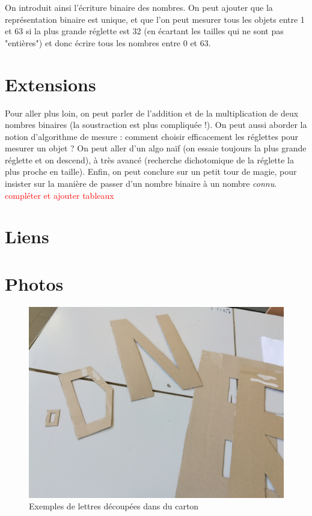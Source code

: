 \documentclass[a4paper,12pt]{scrartcl}
\begin{document}
On introduit ainsi l'écriture binaire des nombres.
On peut ajouter que la représentation binaire est unique, et que l'on peut mesurer tous les objets entre 1 et 63 si la plus grande réglette est 32 (en écartant les tailles qui ne sont pas "entières") et donc écrire tous les nombres entre 0 et 63.


\section{Extensions}

Pour aller plus loin, on peut parler de l'addition et de la multiplication de deux nombres binaires (la soustraction est plus compliquée !).
On peut aussi aborder la notion d'algorithme de mesure : comment choisir efficacement les réglettes pour mesurer un objet ? On peut aller d'un algo naïf (on essaie toujours la plus grande réglette et on descend), à très avancé (recherche dichotomique de la réglette la plus proche en taille).
Enfin, on peut conclure sur un petit tour de magie, pour insister sur la manière de passer d'un nombre binaire à un nombre \textit{connu}. 
\textcolor{red}{compléter et ajouter tableaux}


\section{Liens}




\section{Photos}

\begin{figure}
\begin{center}
\includegraphics[width=0.7\linewidth]{images/lettres.jpg} 
\end{center}
\caption{Exemples de lettres découpées dans du carton}
\label{fig:lettres}
\end{figure}
\end{document}
